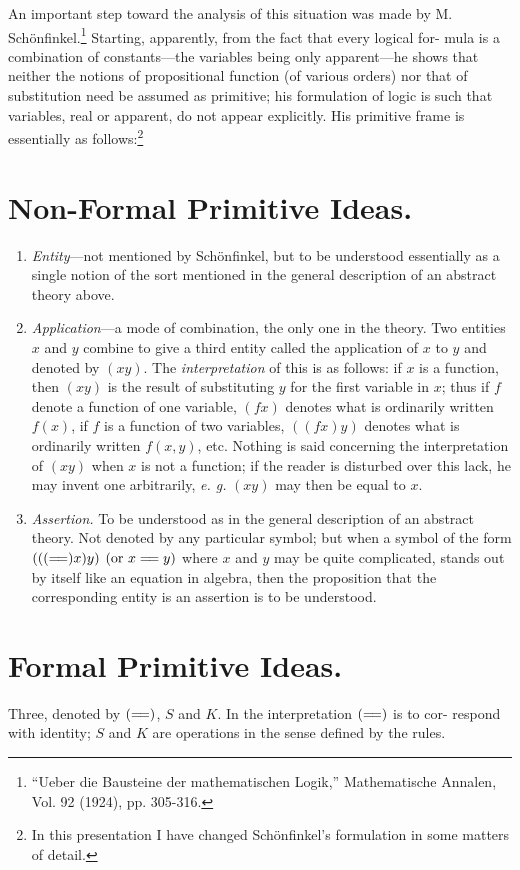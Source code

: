 \documentclass[10pt, twoside]{extarticle}
\newcommand\litem[1]{\item{\textit{#1}}}
\newcommand\longeq{=\joinrel=}
\theoremstyle{breaktheorem}
\theoremstyle{mylemma}
\theoremstyle{mydefinition}
\theoremstyle{mycorollary}
\begin{document}
An important step toward the analysis of this situation was made by
M. Schönfinkel.\footnote{``Ueber die Bausteine der mathematischen Logik,'' Mathematische Annalen, Vol. 92 (1924), pp. 305-316.} Starting, apparently, from the fact that every logical for-
mula is a combination of constants---the variables being only apparent---he
shows that neither the notions of propositional function (of various orders)
nor that of substitution need be assumed as primitive; his formulation of
logic is such that variables, real or apparent, do not appear explicitly. His primitive frame is essentially as follows:\footnote{In this presentation I have changed Schönfinkel's formulation in some matters of detail.}

\section{Non-Formal Primitive Ideas.}
\begin{enumerate}[label=\arabic*.,font=\itshape,wide]
\litem{Entity}---not mentioned by Schönfinkel, but to be understood
essentially as a single notion of the sort mentioned in the general description
of an abstract theory above.

\litem{Application}---a mode of combination, the only one in the theory.
Two entities \(x\) and \(y\) combine to give a third entity called the application of
\(x\) to \(y\) and denoted by \((xy)\). The \textit{interpretation} of this is as follows: if \(x\) is a function,
then \((xy)\) is the result of substituting \(y\) for the first variable in \(x\);
thus if \(f\) denote a function of one variable, \((fx)\) denotes what is ordinarily
written \(f(x)\), if \(f\) is a function of two variables, \(((fx) y)\) denotes what is
ordinarily written \(f(x, y)\), etc. Nothing is said concerning the interpretation
of \((xy)\) when \(x\) is not a function; if the reader is disturbed over this lack,
he may invent one arbitrarily, \textit{e. g.} \((xy)\) may then be equal to \(x\).

\litem{Assertion.} To be understood as in the general description of an
abstract theory. Not denoted by any particular symbol; but when a symbol
of the form \((((\longeq)x)y)\) \((\text{or } x \longeq y)\) where \(x\) and \(y\) may be quite complicated,
stands out by itself like an equation in algebra, then the proposition that the
corresponding entity is an assertion is to be understood.
\end{enumerate}

\section{Formal Primitive Ideas.}
\indent Three, denoted by \((\longeq)\), \(S\) and \(K\). In the interpretation \((\longeq)\) is to cor-
respond with identity; \(S\) and \(K\) are operations in the sense defined by the
rules.
\end{document}
